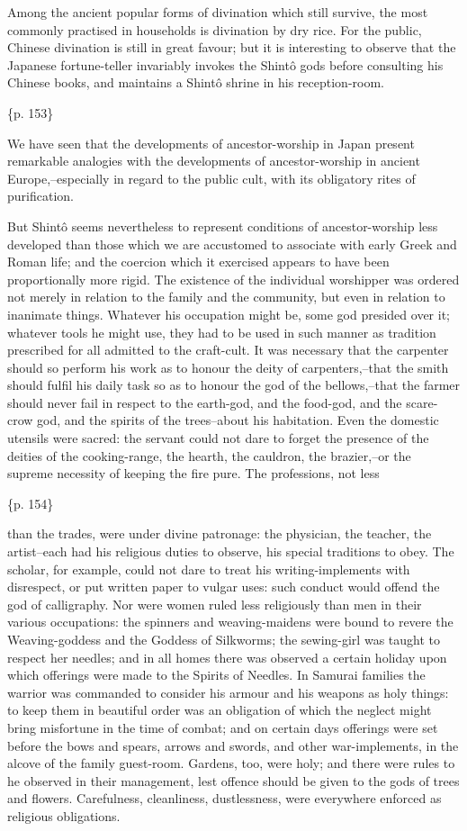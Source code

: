 Among the ancient popular forms of divination which still survive, the most commonly practised in households is divination by dry rice. For the public, Chinese divination is still in great favour; but it is interesting to observe that the Japanese fortune-teller invariably invokes the Shintô gods before consulting his Chinese books, and maintains a Shintô shrine in his reception-room.

\{p. 153\}

We have seen that the developments of ancestor-worship in Japan present remarkable analogies with the developments of ancestor-worship in ancient Europe,--especially in regard to the public cult, with its obligatory rites of purification.

But Shintô seems nevertheless to represent conditions of ancestor-worship less developed than those which we are accustomed to associate with early Greek and Roman life; and the coercion which it exercised appears to have been proportionally more rigid. The existence of the individual worshipper was ordered not merely in relation to the family and the community, but even in relation to inanimate things. Whatever his occupation might be, some god presided over it; whatever tools he might use, they had to be used in such manner as tradition prescribed for all admitted to the craft-cult. It was necessary that the carpenter should so perform his work as to honour the deity of carpenters,--that the smith should fulfil his daily task so as to honour the god of the bellows,--that the farmer should never fail in respect to the earth-god, and the food-god, and the scare-crow god, and the spirits of the trees--about his habitation. Even the domestic utensils were sacred: the servant could not dare to forget the presence of the deities of the cooking-range, the hearth, the cauldron, the brazier,--or the supreme necessity of keeping the fire pure. The professions, not less

\{p. 154\}

than the trades, were under divine patronage: the physician, the teacher, the artist--each had his religious duties to observe, his special traditions to obey. The scholar, for example, could not dare to treat his writing-implements with disrespect, or put written paper to vulgar uses: such conduct would offend the god of calligraphy. Nor were women ruled less religiously than men in their various occupations: the spinners and weaving-maidens were bound to revere the Weaving-goddess and the Goddess of Silkworms; the sewing-girl was taught to respect her needles; and in all homes there was observed a certain holiday upon which offerings were made to the Spirits of Needles. In Samurai families the warrior was commanded to consider his armour and his weapons as holy things: to keep them in beautiful order was an obligation of which the neglect might bring misfortune in the time of combat; and on certain days offerings were set before the bows and spears, arrows and swords, and other war-implements, in the alcove of the family guest-room. Gardens, too, were holy; and there were rules to he observed in their management, lest offence should be given to the gods of trees and flowers. Carefulness, cleanliness, dustlessness, were everywhere enforced as religious obligations.

